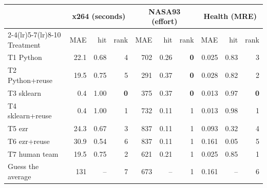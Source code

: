 \begin{tabular}{lrrrrrrrrr}
\toprule
 & \multicolumn{3}{c}{x264 (seconds)} & \multicolumn{3}{c}{NASA93 (effort)} & \multicolumn{3}{c}{Health (MRE)} \\
\cmidrule(lr){2-4}\cmidrule(lr){5-7}\cmidrule(lr){8-10}
Treatment & MAE & hit & rank & MAE & hit & rank & MAE & hit & rank \\
\midrule
T1 Python & 22.1 & 0.68 & 4 & 702 & 0.26 & \textbf{0} & 0.025 & 0.83 & 3 \\
T2 Python+reuse & 19.5 & 0.75 & 5 & 291 & 0.37 & \textbf{0} & 0.028 & 0.82 & 2 \\
T3 sklearn & 0.4 & 1.00 & \textbf{0} & 375 & 0.37 & \textbf{0} & 0.013 & 0.97 & \textbf{0} \\
T4 sklearn+reuse & 0.4 & 1.00 & 1 & 732 & 0.11 & 1 & 0.013 & 0.98 & 1 \\
T5 ezr & 24.3 & 0.67 & 3 & 837 & 0.11 & 1 & 0.093 & 0.32 & 4 \\
T6 ezr+reuse & 30.9 & 0.54 & 6 & 837 & 0.11 & 1 & 0.161 & 0.05 & 5 \\
T7 human team & 19.5 & 0.75 & 2 & 621 & 0.21 & 1 & 0.025 & 0.85 & 1 \\
\midrule Guess the average & 131 & -- & 7 & 673 & -- & 1 & 0.161 & -- & 6 \\
\bottomrule
\end{tabular}